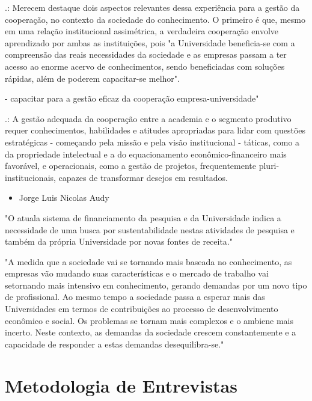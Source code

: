 .: Merecem destaque dois aspectos relevantes dessa experiência para a gestão da cooperação, no contexto da sociedade do conhecimento. O primeiro é que, mesmo em uma relação institucional assimétrica, a verdadeira cooperação envolve aprendizado por ambas as instituições, pois "a Universidade beneficia-se com a compreensão das reais necessidades da sociedade e as empresas passam a ter acesso ao enorme acervo de conhecimentos, sendo beneficiadas com soluções rápidas, além de poderem capacitar-se melhor". 

- capacitar para a gestão eficaz da cooperação empresa-universidade"

.: A gestão adequada da cooperação entre a academia e o segmento produtivo requer conhecimentos, habilidades e atitudes apropriadas para lidar com questões estratégicas - começando pela missão e pela visão institucional - táticas, como a da propriedade intelectual e a do equacionamento econômico-financeiro mais favorável, e operacionais, como a gestão de projetos, frequentemente pluri-institucionais, capazes de transformar desejos em resultados. 

\begin{itemize}
\item Jorge Luis Nicolas Audy
\end{itemize}

"O atuala sistema de financiamento da pesquisa e da Universidade indica a necessidade de uma busca por sustentabilidade nestas atividades de pesquisa e também da própria Universidade por novas fontes de receita."

"A medida que a sociedade vai se tornando mais baseada no conhecimento, as empresas vão mudando suas características e o mercado de trabalho vai setornando mais intensivo em conhecimento, gerando demandas por um novo tipo de profissional. Ao mesmo tempo a sociedade passa a esperar mais das Universidades em termos de contribuições ao processo de desenvolvimento econômico e social. Os problemas se tornam mais complexos e o ambiene mais incerto. Neste contexto, as demandas da sociedade crescem constantemente e a capacidade de responder a estas demandas desequilibra-se."

\section{Metodologia de Entrevistas}
\label{cha:ensino}

